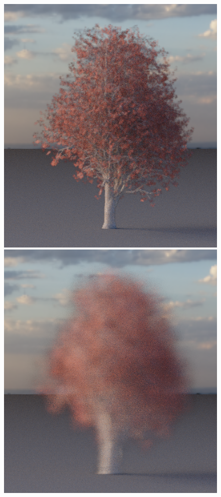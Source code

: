 \begin{figure}[t]
\begin{center}
\begin{minipage}[c]{0.24\textwidth}
            \includegraphics[valign=c, width=\linewidth]{img/EA01a_0.1.png}
        \end{minipage}
        \begin{minipage}[c]{0.24\textwidth}
            \includegraphics[valign=c, width=\linewidth]{img/EA01a_0.8.png}
        \end{minipage}
    

\end{center}
\end{figure}
